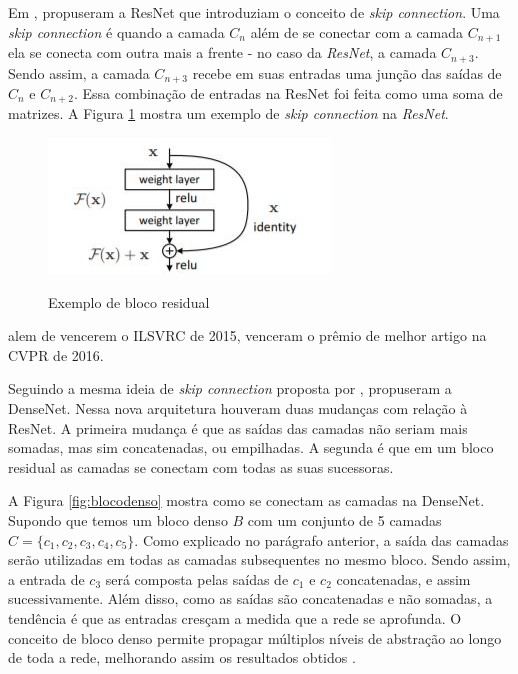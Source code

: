 Em \citeyear{he-2016}, \citeauthor{he-2016} propuseram a \ac{ResNet} que introduziam o conceito de \textit{skip connection}. Uma \textit{skip connection} é quando a camada $C_n$ além de se conectar com a camada $C_{n+1}$ ela se conecta com outra mais a frente - no caso da \textit{\ac{ResNet}}, a camada $C_{n+3}$. Sendo assim, a camada $C_{n+3}$ recebe em suas entradas uma junção das saídas de $C_{n}$ e $C_{n+2}$. Essa combinação de entradas na \ac{ResNet} foi feita como uma soma de matrizes. A Figura \ref{fig:blocoresidual} mostra um exemplo de \textit{skip connection} na \textit{\ac{ResNet}}.

\begin{figure}[H]
	\setlength{\abovecaptionskip}{0pt}
	\setlength{\belowcaptionskip}{0pt}
	\caption[Exemplo de bloco residual]{Exemplo de bloco residual}
	\centering
	\includegraphics[width=.5\textwidth]{imagem/0x_resnet_arch.jpg}
	\captionsetup{justification=centering}
	\label{fig:blocoresidual}
\end{figure}

 alem de vencerem o \ac{ILSVRC} de 2015, venceram o prêmio de melhor artigo na \ac{CVPR} de 2016.

Seguindo a mesma ideia de \textit{skip connection} proposta por ,  propuseram a \ac{DenseNet}. Nessa nova arquitetura houveram duas mudanças com relação à \ac{ResNet}. A primeira mudança é que as saídas das camadas não seriam mais somadas, mas sim concatenadas, ou empilhadas. A segunda é que em um bloco residual as camadas se conectam com todas as suas sucessoras. 

A Figura \ref{fig:blocodenso} mostra como se conectam as camadas na \ac{DenseNet}. Supondo que temos um bloco denso $B$ com um conjunto de 5 camadas $C = \{c_1, c_2, c_3, c_4, c_5\}$. Como explicado no parágrafo anterior, a saída das camadas serão utilizadas em todas as camadas subsequentes no mesmo bloco. Sendo assim, a entrada de $c_3$ será composta pelas saídas de $c_1$ e $c_2$ concatenadas, e assim sucessivamente. Além disso, como as saídas são concatenadas e não somadas, a tendência é que as entradas cresçam a medida que a rede se aprofunda. O conceito de bloco denso permite propagar múltiplos níveis de abstração ao longo de toda a rede, melhorando assim os resultados obtidos \cite{liu-2017}.

